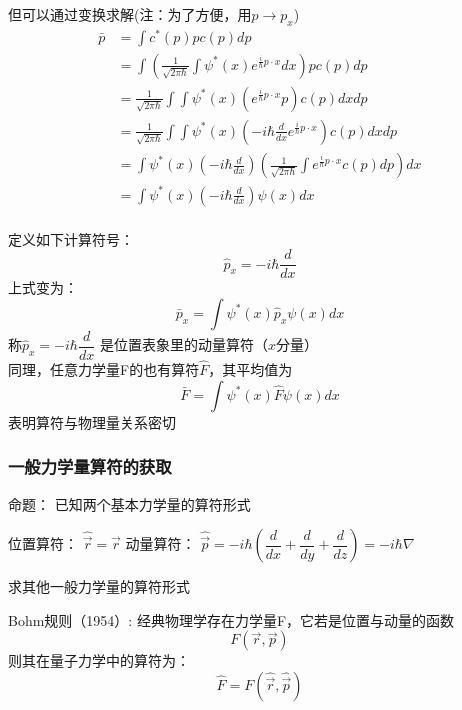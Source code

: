 \begin{frame}
    但可以通过变换求解(注：为了方便，用$p \to p_x$)
    \begin{equation*}
        \begin{split}
            \bar{p}&=\int c^{*}(p) p c(p) d p \\  
            &=\int (\frac{1}{\sqrt{2 \pi \hbar}} \int \psi^{*}(x) e^{\frac{i}{\hbar} p\cdot x} d x) p c\left(p\right) d p \\
            &=\frac{1}{\sqrt{2 \pi \hbar}} \int \int \psi^{*}(x) (e^{\frac{i}{\hbar} p\cdot x}  p) c\left(p\right) d xd p \\
            &=\frac{1}{\sqrt{2 \pi \hbar}} \int \int \psi^{*}(x) (-i\hbar\frac{d}{d x} e^{\frac{i}{\hbar} p\cdot x}) c(p) d xd p \\
            &=\int \psi^{*}(x) (-i\hbar\frac{d}{d x}) (\frac{1}{\sqrt{2 \pi \hbar}} \int e^{\frac{i}{\hbar} p\cdot x} c(p) d p)  d x\\
            &=\int \psi^{*}(x) (-i\hbar\frac{d}{d x}) \psi(x)  d x\\
         \end{split}
    \end{equation*}  
\end{frame} 

\begin{frame}
    定义如下计算符号：
    $$ \hat{p}_x= -i\hbar\frac{d}{d x} $$ 
    上式变为：         
    $$\bar{p}_x=\int \psi^{*}(x) \hat{p}_x \psi(x) d x $$
    称$ \hat{p}_x= -i\hbar\dfrac{d}{d x} $ 是位置表象里的动量算符（$x$分量）\\
    同理，任意力学量F的也有算符$\hat{F}$，其平均值为\\
    $$\bar{F}=\int \psi^{*}(x) \hat{F} \psi(x) d x $$
    表明算符与物理量关系密切
\end{frame} 

\begin{frame} 
    \frametitle{一般力学量算符的获取}
    \begin{tcolorbox1}{命题：}
    已知两个基本力学量的算符形式
    \begin{itemize}
        \Item  位置算符： $ \hat{\vec{r}} =\vec{r} $
        \Item  动量算符： $ \hat{\vec{p}} =-i\hbar(\dfrac{d}{d x}+ \dfrac{d}{d y} + \dfrac{d}{d z})=-i\hbar \nabla $
    \end{itemize}
    求其他一般力学量的算符形式
    \end{tcolorbox1}
    \alert{Bohm规则（1954）:} 经典物理学存在力学量F，它若是位置与动量的函数
    \[F(\vec{r},\vec{p})\]
    则其在量子力学中的算符为：
    \[\hat{F}=F(\hat{\vec{r}},\hat{\vec{p}})\]
\end{frame} 

